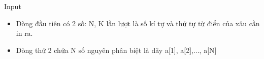 Input
\begin{itemize}
	\item     Dòng đầu tiên có 2 số: N, K lần lượt là số kí tự và thứ tự từ điển của xâu cần in ra.   
	\item     Dòng thứ 2 chứa N số nguyên phân biệt là dãy a[1], a[2],..., a[N]   
\end{itemize}